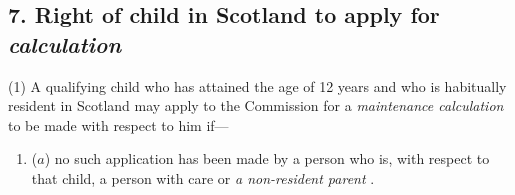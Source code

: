 \documentclass[12pt,a4paper]{article}
\begin{document}
%
%
%
%
%
%

\subsection{7. Right of child in Scotland to apply for 
\emph{calculation}  %
}

(1) A qualifying child who has attained the age of 12 years and who is habitually resident in Scotland may apply to the 
Commission  %
for a 
\emph{maintenance calculation}  %
to be made with respect to him if—
\begin{enumerate}\item[]
($a$) no such application has been made by a person who is, with respect to that child, a person with care or 
\emph{a non-resident parent}%
%
%
.
\end{enumerate}
\end{document}
